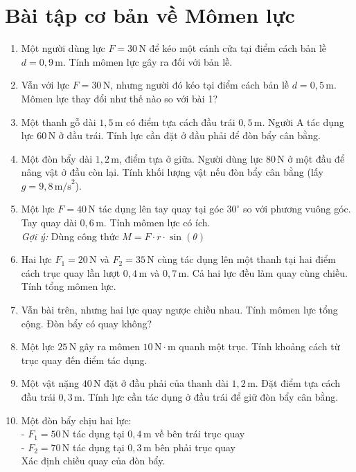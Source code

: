 \documentclass[12pt]{article}
\begin{document}
\section*{Bài tập cơ bản về Mômen lực}

\begin{enumerate}
    \item Một người dùng lực \( F = 30\,\text{N} \) để kéo một cánh cửa tại điểm cách bản lề \( d = 0{,}9\,\text{m} \). Tính mômen lực gây ra đối với bản lề.

    \item Vẫn với lực \( F = 30\,\text{N} \), nhưng người đó kéo tại điểm cách bản lề \( d = 0{,}5\,\text{m} \). Mômen lực thay đổi như thế nào so với bài 1?

    \item Một thanh gỗ dài \( 1{,}5\,\text{m} \) có điểm tựa cách đầu trái \( 0{,}5\,\text{m} \). Người A tác dụng lực \( 60\,\text{N} \) ở đầu trái. Tính lực cần đặt ở đầu phải để đòn bẩy cân bằng.

    \item Một đòn bẩy dài \( 1{,}2\,\text{m} \), điểm tựa ở giữa. Người dùng lực \( 80\,\text{N} \) ở một đầu để nâng vật ở đầu còn lại. Tính khối lượng vật nếu đòn bẩy cân bằng (lấy \( g = 9{,}8\,\text{m/s}^2 \)).

    \item Một lực \( F = 40\,\text{N} \) tác dụng lên tay quay tại góc \( 30^\circ \) so với phương vuông góc. Tay quay dài \( 0{,}6\,\text{m} \). Tính mômen lực có ích. \\ 
    \textit{Gợi ý:} Dùng công thức \( M = F \cdot r \cdot \sin(\theta) \)

    \item Hai lực \( F_1 = 20\,\text{N} \) và \( F_2 = 35\,\text{N} \) cùng tác dụng lên một thanh tại hai điểm cách trục quay lần lượt \( 0{,}4\,\text{m} \) và \( 0{,}7\,\text{m} \). Cả hai lực đều làm quay cùng chiều. Tính tổng mômen lực.

    \item Vẫn bài trên, nhưng hai lực quay ngược chiều nhau. Tính mômen lực tổng cộng. Đòn bẩy có quay không?

    \item Một lực \( 25\,\text{N} \) gây ra mômen \( 10\,\text{N}\cdot\text{m} \) quanh một trục. Tính khoảng cách từ trục quay đến điểm tác dụng.

    \item Một vật nặng \( 40\,\text{N} \) đặt ở đầu phải của thanh dài \( 1{,}2\,\text{m} \). Đặt điểm tựa cách đầu trái \( 0{,}3\,\text{m} \). Tính lực cần tác dụng ở đầu trái để giữ đòn bẩy cân bằng.

    \item Một đòn bẩy chịu hai lực: \\
    - \( F_1 = 50\,\text{N} \) tác dụng tại \( 0{,}4\,\text{m} \) về bên trái trục quay \\
    - \( F_2 = 70\,\text{N} \) tác dụng tại \( 0{,}3\,\text{m} \) bên phải trục quay \\
    Xác định chiều quay của đòn bẩy.
\end{enumerate}
\end{document}
